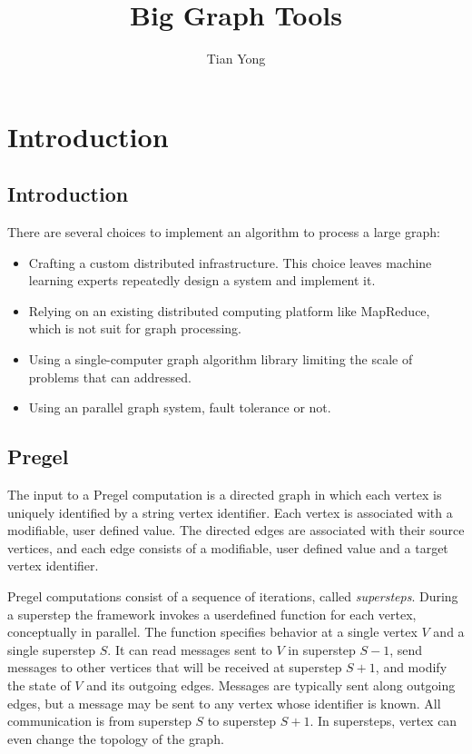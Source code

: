 \documentclass {report}
\begin{document}
\title{Big Graph Tools}
\author{Tian Yong}
\maketitle
\chapter{Introduction}
\section{Introduction}
There are several choices to implement an algorithm to process a large graph:
\begin{itemize}
  \item Crafting a custom distributed infrastructure. This choice leaves machine learning experts repeatedly design a system and implement it.
  \item Relying on an existing distributed computing platform like MapReduce, which is not suit for graph processing.
  \item Using a single-computer graph algorithm library limiting the scale of problems that can addressed.
  \item Using an parallel graph system, fault tolerance or not.
\end{itemize}
\section{Pregel}
The input to a Pregel computation is a directed graph in
which each vertex is uniquely identified by a string vertex
identifier. Each vertex is associated with a modifiable, user
defined value. The directed edges are associated with their
source vertices, and each edge consists of a modifiable, user
defined value and a target vertex identifier.


Pregel computations consist of a sequence of iterations, called \emph{supersteps}. During a superstep the framework invokes a userdefined function for each vertex, conceptually in parallel.
The function specifies behavior at a single vertex $V$ and a
single superstep $S$. It can read messages sent to $V$ in superstep $S-1$, send messages to other vertices that will be received at superstep $S + 1$, and modify the state of $V$ and
its outgoing edges. Messages are typically sent along outgoing edges, but a message may be sent to any vertex whose
identifier is known.  All communication is from superstep $S$ to superstep $S + 1$. In supersteps, vertex can even change the topology of the graph.
\end{document}
